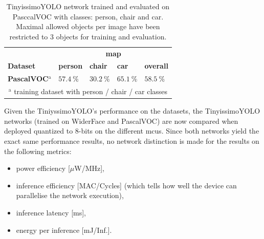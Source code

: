 \documentclass[conference]{IEEEtran}
\newcommand{\ra}[1]{\renewcommand{\arraystretch}{#1}}
\begin{document}
\vspace{-0.8cm}
\begin{table}[htbp]
    \ra{1.1}
    \caption{TinyissimoYOLO network trained and evaluated on PasccalVOC with classes: person, chair and car. Maximal allowed objects per image have been restricted to 3 objects for training and evaluation.}
    \begin{center}
    \begin{tabular}{@{}lllll@{}}
    \toprule
         & \multicolumn{4}{c}{\textbf{\gls{map}}} \\
        \cmidrule{2-5}
        \textbf{Dataset} & \textbf{person} &  \textbf{chair} & \textbf{car} & \textbf{overall} \\
        \midrule
        \textbf{PascalVOC$^{\mathrm{a}}$} & $\SI{57.4}{\percent}$ & $\SI{30.2}{\percent}$  & $\SI{65.1}{\percent}$ & $\SI{58.5}{\percent}$ \\
        \bottomrule
        \multicolumn{5}{c}{$^{\mathrm{a}}$ training dataset with person / chair / car classes} \\
    \end{tabular}
    \label{tab:map_results_voc}
    \end{center}
\end{table}

\vspace{-0.35cm}
Given the TiniyssimoYOLO's performance on the datasets, the TinyissimoYOLO networks (trained on WiderFace and PascalVOC) are now compared when deployed quantized to 8-bits on the different \glspl{mcu}. Since both networks yield the exact same performance results, no network distinction is made for the results on the following metrics: 
\begin{itemize}
\item power efficiency [$\mu$W/MHz],
\item inference efficiency [MAC/Cycles] (which tells how well the device can parallelise the network execution),
\item inference latency [ms],  
\item energy per inference [mJ/Inf.].
\end{itemize}
\end{document}
